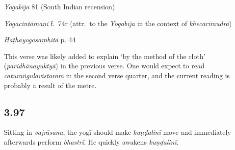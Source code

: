 \begin{ekdosis}
\begin{testimonia}[hp03_096_2]
\emph{Yogabīja} 81 (South Indian recension)
\begin{versinnote}
\end{versinnote}

\emph{Yogacintāmaṇi} f.~74r (attr.~to the \emph{Yogabīja} in the context of \emph{khecarīmudrā})
\begin{versinnote}
\end{versinnote}

\emph{Haṭhayogasaṃhitā} p. 44
\begin{versinnote}
\end{versinnote}
\end{testimonia}

\begin{philcomm}[hp03_096_2]
This verse was likely added to explain `by the method of the cloth' (\emph{paridhānayuktyā}) in the previous verse. One would expect to read \emph{caturaṅgulavistāram} in the second verse quarter, and the current reading is probably a result of the metre.
\end{philcomm}


\subsection*{3.97}
\begin{translation}[hp03_097]
Sitting in \emph{vajrāsana}, the yogī should make \emph{kuṇḍalinī} move and immediately afterwards perform \emph{bhastrī}. He quickly awakens \emph{kuṇḍalinī}.
\end{translation}



\end{ekdosis}
